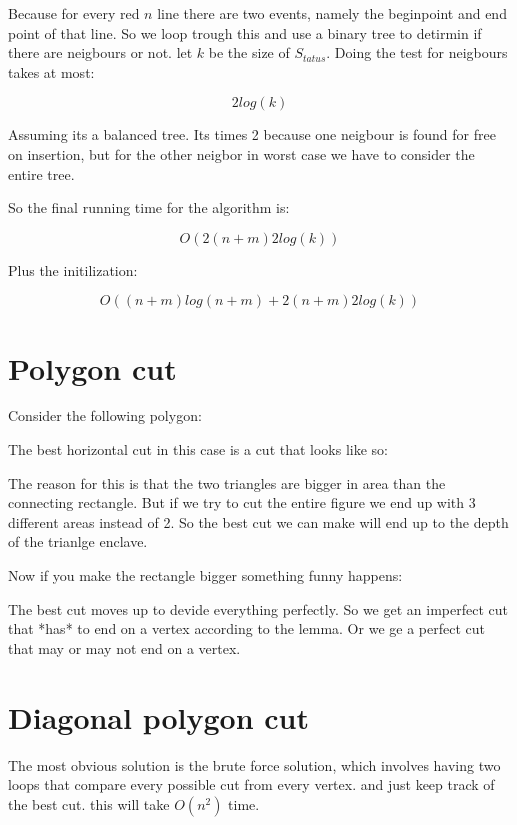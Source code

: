 \documentclass{article}
\begin{document}
Because for every red $n$ line there are two events, namely the beginpoint and
end point of that line.
So we loop trough this and use a binary tree to detirmin if there are neigbours
or not.
let $k$ be the size of $S_{tatus}$.
Doing the test for neigbours takes at most:

\[2 log(k)\]

Assuming its a balanced tree. Its times 2 because one neigbour is found for
free on insertion, but for the other neigbor in worst case we have to
consider the entire tree.

So the final running time for the algorithm is:

\[O(2(n+m) 2log(k))\]

Plus the initilization:

\[O((n+m)log(n+m)+2(n+m) 2log(k))\]

\section{Polygon cut}
Consider the following polygon:


The best horizontal cut in this case is a cut that looks like so:


The reason for this is that the two triangles are bigger in area than
the connecting rectangle. But if we try to cut the entire figure we
end up with 3 different areas instead of 2. So the best cut we can
make will end up to  the depth of the trianlge enclave.

Now if you make the rectangle bigger something funny happens:


The best cut moves up to devide everything perfectly.
So we get an imperfect cut that *has* to end on a vertex according to
the lemma. Or we ge a perfect cut that may or may not end on a vertex.

\section{Diagonal polygon cut}
The most obvious solution is the brute force solution, which involves
having two loops that compare every possible cut from every vertex.
and just keep track of the best cut. this will take $O(n^2)$ time.
\end{document}

